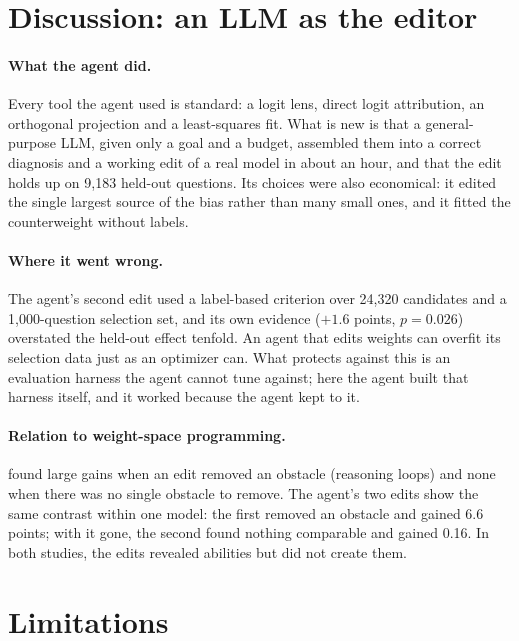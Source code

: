 \documentclass[11pt]{article}
\begin{document}
\section{Discussion: an LLM as the editor}
\label{sec:discussion}

\paragraph{What the agent did.} Every tool the agent used is standard: a logit lens, direct logit attribution, an orthogonal projection and a least-squares fit. What is new is that a general-purpose LLM, given only a goal and a budget, assembled them into a correct diagnosis and a working edit of a real model in about an hour, and that the edit holds up on 9{,}183 held-out questions. Its choices were also economical: it edited the single largest source of the bias rather than many small ones, and it fitted the counterweight without labels.

\paragraph{Where it went wrong.} The agent's second edit used a label-based criterion over 24{,}320 candidates and a 1{,}000-question selection set, and its own evidence ($+1.6$ points, $p=0.026$) overstated the held-out effect tenfold. An agent that edits weights can overfit its selection data just as an optimizer can. What protects against this is an evaluation harness the agent cannot tune against; here the agent built that harness itself, and it worked because the agent kept to it.

\paragraph{Relation to weight-space programming.} \citet{takehi2026weightspace} found large gains when an edit removed an obstacle (reasoning loops) and none when there was no single obstacle to remove. The agent's two edits show the same contrast within one model: the first removed an obstacle and gained 6.6 points; with it gone, the second found nothing comparable and gained 0.16. In both studies, the edits revealed abilities but did not create them.

\section{Limitations}
\label{sec:limitations}
\end{document}
